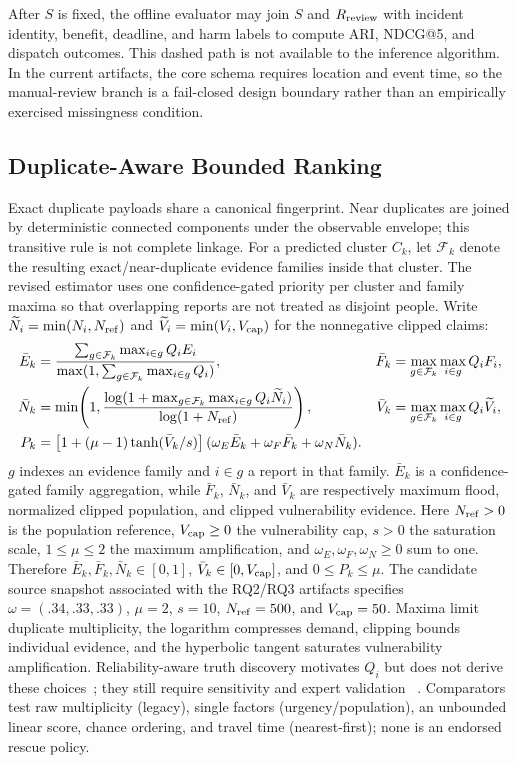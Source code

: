 \documentclass[runningheads]{llncs}
\begin{document}
After $S$ is fixed, the offline evaluator may join $S$ and $R_{\rm review}$
with incident identity, benefit, deadline, and harm labels to compute ARI,
NDCG@5, and dispatch outcomes. This dashed path is not available to the
inference algorithm. In the current artifacts, the core schema requires
location and event time, so the manual-review branch is a fail-closed design
boundary rather than an empirically exercised missingness condition.

\subsection{Duplicate-Aware Bounded Ranking}

Exact duplicate payloads share a canonical fingerprint. Near duplicates are
joined by deterministic connected components under the observable envelope;
this transitive rule is not complete linkage. For a predicted cluster $C_k$,
let $\mathcal F_k$ denote the resulting exact/near-duplicate evidence
families inside that cluster. The revised estimator uses one confidence-gated
priority per cluster and family maxima so that overlapping reports are not
treated as disjoint people. Write
$\widetilde N_i=\min(N_i,N_{\rm ref})$ and
$\widetilde V_i=\min(V_i,V_{\rm cap})$ for the nonnegative clipped claims:
\begin{align}
\bar E_k&=\frac{\sum_{g\in\mathcal F_k}\max_{i\in g}Q_iE_i}
 {\max(1,\sum_{g\in\mathcal F_k}\max_{i\in g}Q_i)},&
\bar F_k&=\max_{g\in\mathcal F_k}\max_{i\in g}Q_iF_i,\nonumber\\
\bar N_k&=\min\!\left(1,\frac{\log(1+\max_{g\in\mathcal F_k}\max_{i\in g}Q_i\widetilde N_i)}
 {\log(1+N_{\rm ref})}\right),&
\bar V_k&=\max_{g\in\mathcal F_k}\max_{i\in g}Q_i\widetilde V_i,\nonumber\\
P_k&=\left[1+(\mu-1)\tanh(\bar V_k/s)\right]
 (\omega_E\bar E_k+\omega_F\bar F_k+\omega_N\bar N_k).
\label{eq:priority}
\end{align}
$g$ indexes an evidence family and $i\in g$ a report in that family.
$\bar E_k$ is a confidence-gated family aggregation, while $\bar F_k$,
$\bar N_k$, and $\bar V_k$ are respectively maximum flood, normalized clipped
population, and clipped vulnerability evidence. Here $N_{\rm ref}>0$ is the
population reference, $V_{\rm cap}\geq0$ the vulnerability cap, $s>0$ the
saturation scale, $1\leq\mu\leq2$ the maximum amplification, and
$\omega_E,\omega_F,\omega_N\geq0$ sum to one. Therefore
$\bar E_k,\bar F_k,\bar N_k\in[0,1]$, $\bar V_k\in[0,V_{\rm cap}]$, and
$0\leq P_k\leq\mu$.
The candidate source snapshot associated with the RQ2/RQ3 artifacts specifies
$\omega=(.34,.33,.33)$, $\mu=2$, $s=10$, $N_{\rm ref}=500$, and
$V_{\rm cap}=50$. Maxima limit duplicate multiplicity, the logarithm compresses
demand, clipping bounds individual evidence, and the hyperbolic tangent
saturates vulnerability amplification. Reliability-aware truth discovery
motivates $Q_i$ but does not derive these choices~\cite{wang2012truth}; they
still require sensitivity and expert validation
~\cite{tate2012vulnerability,gralla2014review}. Comparators test raw
multiplicity (legacy), single factors (urgency/population), an unbounded linear
score, chance ordering, and travel time (nearest-first); none is an endorsed
rescue policy.
\end{document}
